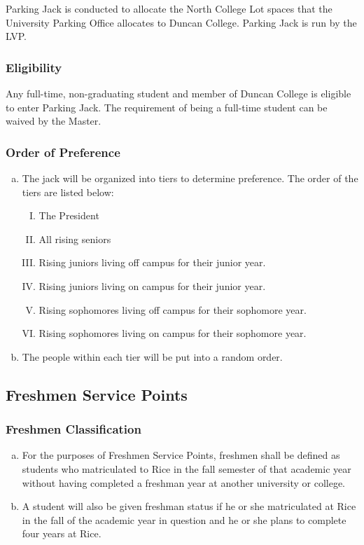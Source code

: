 \documentclass[USletter,12pt]{article}
\begin{document}
\begin{enumerate}[(a)]
Parking Jack is conducted to allocate the North College Lot spaces that the University Parking Office allocates to Duncan College.  Parking Jack is run by the LVP.

\subsubsection{Eligibility}
Any full-time, non-graduating student and member of Duncan College is eligible to enter Parking Jack.  The requirement of being a full-time student can be waived by the Master.

\subsubsection{Order of Preference}
\begin{enumerate}[(a)]
\item The jack will be organized into tiers to determine preference.  The order of the tiers are listed below:
	\begin{enumerate}[(I)]
	\item The President
	\item All rising seniors
	\item Rising juniors living off campus for their junior year.
	\item Rising juniors living on campus for their junior year.
	\item Rising sophomores living off campus for their sophomore year.
	\item Rising sophomores living on campus for their sophomore year.
	\end{enumerate}
\item The people within each tier will be put into a random order.
\end{enumerate}


\subsection{Freshmen Service Points}


\subsubsection{Freshmen Classification}
\begin{enumerate}[(a)]
\item For the purposes of Freshmen Service Points, freshmen shall be defined as students who matriculated to Rice in the fall semester of that academic year without having completed a freshman year at another university or college.
\item A student will also be given freshman status if he or she matriculated at Rice in the fall of the academic year in question and he or she plans to complete four years at Rice.
\end{enumerate}


\end{enumerate}
\end{document}
